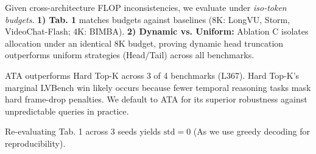 \vspace{-0.2em}
Given cross-architecture FLOP inconsistencies, we evaluate under \textit{iso-token budgets}. \textbf{1) Tab. 1} matches budgets against baselines (8K: LongVU, Storm, VideoChat-Flash; 4K: BIMBA). \textbf{2) Dynamic vs. Uniform:} Ablation C isolates allocation under an identical 8K budget, proving dynamic head truncation outperforms uniform strategies (Head/Tail) across all benchmarks.

\vspace{-0.2em}
ATA outperforms Hard Top-K across 3 of 4 benchmarks (L367). Hard Top-K's marginal LVBench win likely occurs because fewer temporal reasoning tasks mask hard frame-drop penalties. We default to ATA for its superior robustness against unpredictable queries in practice.

\vspace{-0.2em}
Re-evaluating Tab. 1 across 3 seeds yields \textbf{$\text{std}=0$} (As we use greedy decoding for reproducibility).
